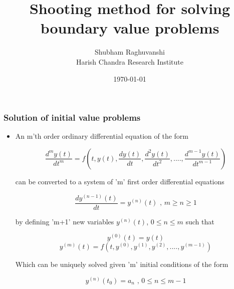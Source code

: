 \documentclass{beamer}
\title{Shooting method for solving boundary value problems} %
\author{Shubham Raghuvanshi \\Harish Chandra Research Institute } %
\date{\today} %
\begin{document}
\begin{frame}
\titlepage %
\end{frame}
\begin{frame}
	\frametitle{Solution of initial value problems}

	\begin{itemize}
		
		\item An m'th order ordinary differential equation of the form 
		
		\begin{equation}
		\frac{d^m y(t)}{d t^m} = f \left(t, y(t), \frac{d y(t)}{d t}, \frac{d^2 y(t)}{d t^2},...., \frac{d^{m-1} y(t)}{d t^{m-1}}      \right)
		\end{equation}
			
		can be converted to a system of 'm' first order differential equations 

		\begin{equation}
		\frac{d y^{(n-1)}(t)}{dt} = y^{(n)}(t)  \text{     ,    } m \ge n \ge 1 		
		\end{equation}

by defining 'm+1' new variables $y^{(n)}(t)$,   $ 0 \le n \le m $ such that  
		
	\begin{equation}
	y^{(0)}(t) = y(t)
	\end{equation}
	\begin{equation}
	y^{(m)}(t) = f(t, y^{(0)}, y^{(1)}, y^{(2)},...., y^{(m-1)}   )
	\end{equation}
	
Which can be uniquely solved given 'm' initial conditions of the form 

\begin{equation}
     y^{(n)}(t_0) = a_n  \text{     ,    }  0 \le n \le m-1
\end{equation}

	\end{itemize}	
\end{frame}
\end{document}
